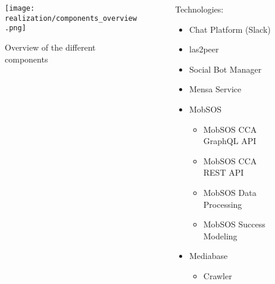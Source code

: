 \begin{frame}\begin{columns}
    \begin{column}[]{0.7\textwidth}
      \begin{figure}
        \centering
        \texttt{[image: realization/components\_overview.png]}
        \caption{Overview of the different components}
        \label{fig:componentsOverview}
      \end{figure}
    \end{column}
    \begin{column}[]{0.3\textwidth}
      Technologies:
      \begin{itemize}
        \item Chat Platform (Slack)
        \item las2peer
        \item Social Bot Manager
        \item Mensa Service
        \item MobSOS
              \begin{itemize}
                \item MobSOS CCA GraphQL API
                \item MobSOS CCA REST API
                \item MobSOS Data Processing
                \item MobSOS Success Modeling
              \end{itemize}
        \item Mediabase
              \begin{itemize}
                \item Crawler
              \end{itemize}
      \end{itemize}
    \end{column}
  \end{columns}
\end{frame}

